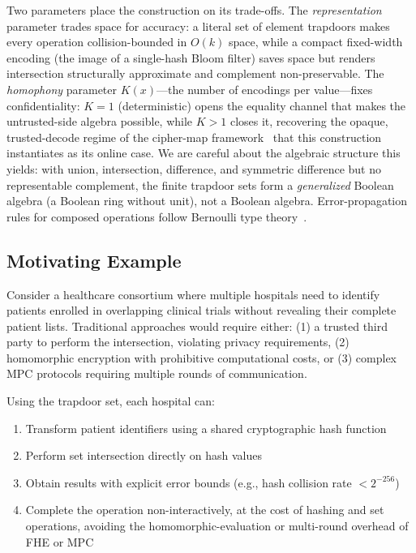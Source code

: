 \documentclass[10pt,conference]{IEEEtran}
\begin{document}
Two parameters place the construction on its trade-offs. The \emph{representation} parameter trades space for accuracy: a literal set of element trapdoors makes every operation collision-bounded in $O(k)$ space, while a compact fixed-width encoding (the image of a single-hash Bloom filter) saves space but renders intersection structurally approximate and complement non-preservable. The \emph{homophony} parameter $K(x)$---the number of encodings per value---fixes confidentiality: $K = 1$ (deterministic) opens the equality channel that makes the untrusted-side algebra possible, while $K > 1$ closes it, recovering the opaque, trusted-decode regime of the cipher-map framework~\cite{cipher-maps} that this construction instantiates as its online case. We are careful about the algebraic structure this yields: with union, intersection, difference, and symmetric difference but no representable complement, the finite trapdoor sets form a \emph{generalized} Boolean algebra (a Boolean ring without unit), not a Boolean algebra. Error-propagation rules for composed operations follow Bernoulli type theory~\cite{bernoulli-types}.

\subsection{Motivating Example}

Consider a healthcare consortium where multiple hospitals need to identify patients enrolled in overlapping clinical trials without revealing their complete patient lists. Traditional approaches would require either: (1) a trusted third party to perform the intersection, violating privacy requirements, (2) homomorphic encryption with prohibitive computational costs, or (3) complex MPC protocols requiring multiple rounds of communication.

Using the trapdoor set, each hospital can:
\begin{enumerate}
\item Transform patient identifiers using a shared cryptographic hash function
\item Perform set intersection directly on hash values
\item Obtain results with explicit error bounds (e.g., hash collision rate $< 2^{-256}$)
\item Complete the operation non-interactively, at the cost of hashing and set operations, avoiding the homomorphic-evaluation or multi-round overhead of FHE or MPC
\end{enumerate}
\end{document}
